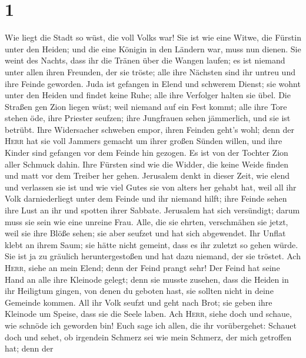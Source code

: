 \hypertarget{section}{%
\section{1}\label{section}}

 Wie liegt die Stadt so wüst, die voll Volks war! Sie ist
wie eine Witwe, die Fürstin unter den Heiden; und die eine Königin in
den Ländern war, muss nun dienen.  Sie weint des Nachts,
dass ihr die Tränen über die Wangen laufen; es ist niemand unter allen
ihren Freunden, der sie tröste; alle ihre Nächsten sind ihr untreu und
ihre Feinde geworden.  Juda ist gefangen in Elend und
schwerem Dienst; sie wohnt unter den Heiden und findet keine Ruhe; alle
ihre Verfolger halten sie übel.  Die Straßen gen Zion
liegen wüst; weil niemand auf ein Fest kommt; alle ihre Tore stehen öde,
ihre Priester seufzen; ihre Jungfrauen sehen jämmerlich, und sie ist
betrübt.  Ihre Widersacher schweben empor, ihren Feinden
geht's wohl; denn der \textsc{Herr} hat sie voll Jammers gemacht um
ihrer großen Sünden willen, und ihre Kinder sind gefangen vor dem Feinde
hin gezogen.  Es ist von der Tochter Zion aller Schmuck
dahin. Ihre Fürsten sind wie die Widder, die keine Weide finden und matt
vor dem Treiber her gehen.  Jerusalem denkt in dieser
Zeit, wie elend und verlassen sie ist und wie viel Gutes sie von alters
her gehabt hat, weil all ihr Volk darniederliegt unter dem Feinde und
ihr niemand hilft; ihre Feinde sehen ihre Lust an ihr und spotten ihrer
Sabbate.  Jerusalem hat sich versündigt; darum muss sie
sein wie eine unreine Frau. Alle, die sie ehrten, verschmähen sie jetzt,
weil sie ihre Blöße sehen; sie aber seufzet und hat sich abgewendet.
 Ihr Unflat klebt an ihrem Saum; sie hätte nicht gemeint,
dass es ihr zuletzt so gehen würde. Sie ist ja zu gräulich
heruntergestoßen und hat dazu niemand, der sie tröstet. Ach
\textsc{Herr}, siehe an mein Elend; denn der Feind prangt sehr!
 Der Feind hat seine Hand an alle ihre Kleinode gelegt;
denn sie musste zusehen, dass die Heiden in ihr Heiligtum gingen, von
denen du geboten hast, sie sollten nicht in deine Gemeinde kommen.
 All ihr Volk seufzt und geht nach Brot; sie geben ihre
Kleinode um Speise, dass sie die Seele laben. Ach \textsc{Herr}, siehe
doch und schaue, wie schnöde ich geworden bin!  Euch sage
ich allen, die ihr vorübergehet: Schauet doch und sehet, ob irgendein
Schmerz sei wie mein Schmerz, der mich getroffen hat; denn der
